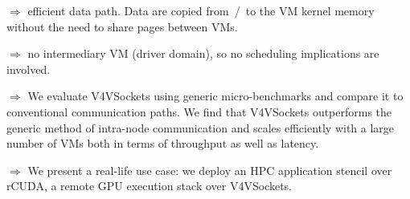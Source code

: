 \documentclass[a0paper,portrait,final]{baposter}
\begin{document}
\begin{poster}
{$\Rightarrow$ efficient data path. Data are copied from~/~to the VM kernel memory
without the need to share pages between VMs.

$\Rightarrow$ no intermediary VM (driver domain), so no scheduling implications are involved. 

$\Rightarrow$ We evaluate V4VSockets using generic micro-benchmarks and compare
it to conventional communication paths. We find that V4VSockets outperforms the
generic method of intra-node communication and scales efficiently with a large
number of VMs both in terms of throughput as well as latency.

$\Rightarrow$ We present a real-life use case: we deploy an HPC application
stencil over rCUDA, a remote GPU execution stack over V4VSockets.

\vspace{1em}
}


%
\end{poster}
\end{document}
